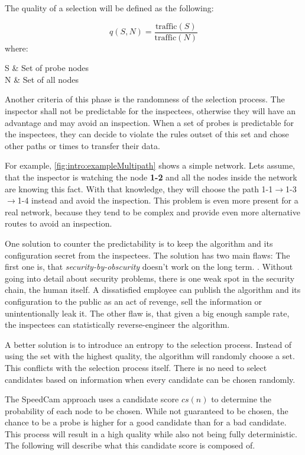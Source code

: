 \documentclass[thesis.tex]{subfiles}
\begin{document}
The quality of a selection will be defined as the following:

\begin{equation} \label{equo:qualitySelection}
q(S,N) = \frac{\text{traffic}(S)}{\text{traffic}(N)}
\end{equation}
where:
\begin{conditions}
    S     &  Set of probe nodes \\
    N     &  Set of all nodes
\end{conditions}

Another criteria of this phase is the randomness of the selection process. The inspector shall not be predictable for the inspectees, otherwise they will have an advantage and may avoid an inspection. When a set of probes is predictable for the inspectees, they can decide to violate the rules outset of this set and chose other paths or times to transfer their data. 

For example, \autoref{fig:intro:exampleMultipath} shows a simple network. Lets assume, that the inspector is watching the node \textbf{1-2} and all the nodes inside the network are knowing this fact. With that knowledge, they will choose the path 1-1$\rightarrow$1-3$\rightarrow$1-4 instead and avoid the inspection. This problem is even more present for a real network, because they tend to be complex and provide even more alternative routes to avoid an inspection.

One solution to counter the predictability is to keep the algorithm and its configuration secret from the inspectees. The solution has two main flaws: The first one is, that \textit{security-by-obscurity} doesn't work on the long term. . Without going into detail about security problems, there is one weak spot in the security chain, the human itself. A dissatisfied employee can publish the algorithm and its configuration to the public as an act of revenge, sell the information or unintentionally leak it. The other flaw is, that given a big enough sample rate, the inspectees can statistically reverse-engineer the algorithm. 

A better solution is to introduce an entropy to the selection process. Instead of using the set with the highest quality, the algorithm will randomly choose a set. This conflicts with the selection process itself. There is no need to select candidates based on information when every candidate can be chosen randomly.

The SpeedCam approach uses a candidate score $cs(n)$ to determine the probability of each node to be chosen. While not guaranteed to be chosen, the chance to be a probe is higher for a good candidate than for a bad candidate. This process will result in a high quality while also not being fully deterministic. The following will describe what this candidate score is composed of.
\end{document}
